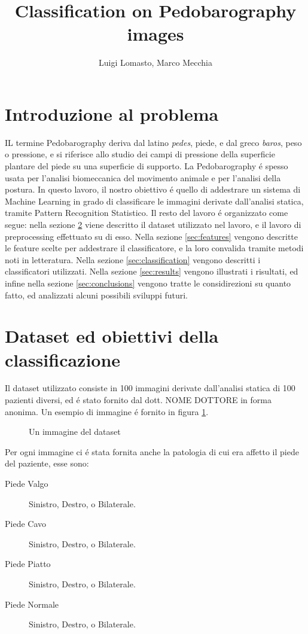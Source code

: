 \documentclass[11pt,twoside,a4paper]{article}
\begin{document}
\title{Classification on Pedobarography images}
\author{Luigi Lomasto, Marco Mecchia} 
\maketitle
\section{Introduzione al problema}
IL termine Pedobarography deriva dal latino \emph{pedes}, piede, e dal greco \emph{baros}, peso o pressione, e si riferisce allo studio dei campi di pressione della superficie plantare del piede su una superficie di supporto. La Pedobarography \'e spesso usata per l'analisi biomeccanica del movimento animale e per l'analisi della postura. In questo lavoro, il nostro obiettivo \'e quello di addestrare un sistema di Machine Learning in grado di classificare le immagini derivate dall'analisi statica, tramite Pattern Recognition Statistico.
Il resto del lavoro \'e organizzato come segue: nella sezione \ref{sec:dataset} viene descritto il dataset utilizzato nel lavoro, e il lavoro di preprocessing effettuato su di esso. Nella sezione \ref{sec:features} vengono descritte le feature scelte per addestrare il classificatore, e la loro convalida tramite metodi noti in letteratura. Nella sezione \ref{sec:classification} vengono descritti i classificatori utilizzati. Nella sezione \ref{sec:results} vengono illustrati i risultati, ed infine nella sezione \ref{sec:conclusions} vengono tratte le considirezioni su quanto fatto, ed analizzati alcuni possibili sviluppi futuri.

\section{Dataset ed obiettivi della classificazione}
\label{sec:dataset}
Il dataset utilizzato consiste in 100 immagini derivate dall'analisi statica di 100 pazienti diversi, ed \'e stato fornito dal dott. NOME DOTTORE in forma anonima. Un esempio di immagine \'e fornito in figura \ref{fig:immagineEsempio}. 
\begin{figure}
\centering
\label{fig:immagineEsempio}
\caption{Un immagine del dataset}
\end{figure}
Per ogni immagine ci \'e stata fornita anche la patologia di cui era affetto il piede del paziente, esse sono:
\begin{description}
\item[Piede Valgo] Sinistro, Destro, o Bilaterale.
\item[Piede Cavo] Sinistro, Destro, o Bilaterale.
\item[Piede Piatto] Sinistro, Destro, o Bilaterale.
\item[Piede Normale] Sinistro, Destro, o Bilaterale.
\end{description}
\end{document}
